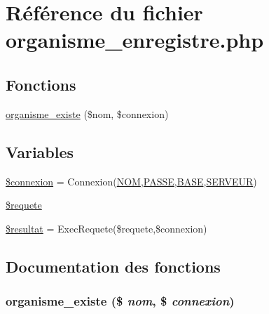 \hypertarget{organisme__enregistre_8php}{
\section{R\'{e}f\'{e}rence du fichier organisme\_\-enregistre.php}
\label{organisme__enregistre_8php}
}
\subsection*{Fonctions}
\begin{CompactItemize}
\item 
\hyperlink{organisme__enregistre_8php_a3}{organisme\_\-existe} (\$nom, \$connexion)
\end{CompactItemize}
\subsection*{Variables}
\begin{CompactItemize}
\item 
\hyperlink{organisme__enregistre_8php_a0}{\$connexion} = Connexion(\hyperlink{pma__connect_8php_a0}{NOM},\hyperlink{pma__connect_8php_a1}{PASSE},\hyperlink{pma__connect_8php_a3}{BASE},\hyperlink{pma__connect_8php_a2}{SERVEUR})
\item 
\hyperlink{organisme__enregistre_8php_a1}{\$requete}
\item 
\hyperlink{organisme__enregistre_8php_a2}{\$resultat} = Exec\-Requete(\$requete,\$connexion)
\end{CompactItemize}


\subsection{Documentation des fonctions}
\hypertarget{organisme__enregistre_8php_a3}{
\subsubsection[organisme\_\-existe]{\setlength{\rightskip}{0pt plus 5cm}organisme\_\-existe (\$ {\em nom}, \$ {\em connexion})}}
\label{organisme__enregistre_8php_a3}




